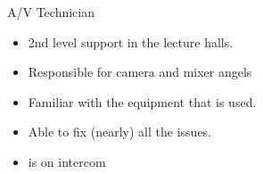 \documentclass[aspectratio=169]{beamer}
\begin{document}

\begin{frame}{A/V Technician}
	\begin{itemize}
		\item 2nd level support in the lecture halls. 
		\item Responsible for camera and mixer angels
		\item Familiar with the equipment that is used. 
		\item Able to fix (nearly) all the issues. 
		\item is on intercom %
	\end{itemize}
\end{frame}


\end{document}
